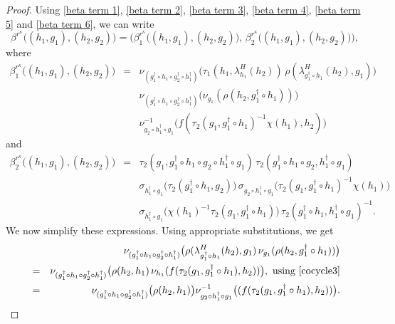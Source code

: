 \documentclass{jonasart}
\theoremstyle{plain}
\begin{document}
\begin{proof}
		Using \eqref{beta term 1}, \eqref{beta term 2}, \eqref{beta term 3}, \eqref{beta term 4}, \eqref{beta term 5} and  \eqref{beta term 6}, we can write
		\begin{equation*}
			\beta^{r^\kappa} \big((h_1,g_1),(h_2,g_2) \big)=\big(\beta^{r^\kappa}_1 \big((h_1,g_1),(h_2,g_2) \big),\, \beta^{r^\kappa}_2 \big((h_1,g_1),(h_2,g_2) \big)\big),
		\end{equation*}
		where
		\begin{eqnarray}
			\beta^{r^\kappa}_1 \big((h_1,g_1),(h_2,g_2) \big)&=&\nu_{(g_1^\dagger\circ h_1\circ g_2^\dagger\circ h_1^\dagger)}\big(\tau_1(h_1,\lambda^H_{ h_1}(h_2))\,\rho(\lambda^H_{g_1^\dagger\circ h_1}(h_2),g_1) \big)\nonumber\\
			&&\nu_{(g_1^\dagger\circ h_1\circ g_2^\dagger\circ h_1^\dagger )} \big(\nu_{g_1}(\rho(h_2,g_1^\dagger\circ h_1)) \big)\nonumber\\
			&&\nu^{-1}_{g_2\circ h_1^{\dagger}\circ g_1} \big(f(\tau_2(g_1,g_1^\dagger\circ h_1)^{-1}\chi(h_1),h_2)\big)\label{beta 1 exp}
		\end{eqnarray}
		and
		\begin{eqnarray*}
			\beta^{r^\kappa}_2 \big((h_1,g_1),(h_2,g_2) \big)&=&\tau_2(g_1,g_1^\dagger\circ h_1\circ g_2\circ h_1^\dagger\circ g_1) \, \tau_2(g_1^\dagger\circ h_1\circ g_2,h_1^\dagger\circ g_1)\nonumber\\
			&&\sigma_{h_1^\dagger\circ g_1} \big(\tau_2(g_1^\dagger\circ h_1,g_2) \big) \, \sigma_{g_2\circ h_1^{\dagger}\circ g_1}\big(\tau_2(g_1,g_1^\dagger\circ h_1)^{-1}\chi(h_1)\big)\nonumber\\
			&&\sigma_{h_1^{\dagger}\circ g_1}\big(\chi(h_1)^{-1}\tau_2(g_1,g_1^\dagger\circ h_1)\big)\, \tau_2(g_1^\dagger\circ h_1,h_1^\dagger\circ g_1)^{-1}.\label{beta 2 exp}
		\end{eqnarray*}
		We now simplify these expressions. Using appropriate substitutions, we get
		\begin{eqnarray*}
			&& \nu_{(g_1^\dagger\circ h_1\circ g_2^\dagger\circ h_1^\dagger)} \big(\rho(\lambda^H_{g_1^\dagger\circ h_1}(h_2),g_1)\, \nu_{g_1}(\rho(h_2,g_1^\dagger\circ h_1)) \big)\\
			&=&\nu_{(g_1^\dagger\circ h_1\circ g_2^\dagger\circ h_1^\dagger)} \big(\rho(h_2,h_1)\, \nu_{h_1}(f(\tau_2(g_1,g_1^\dagger\circ h_1),h_2))\big),~\text{using \eqref{cocycle3}}\\
			&=&\nu_{(g_1^\dagger\circ h_1\circ g_2^\dagger\circ h_1^\dagger)} \big(\rho(h_2,h_1)\big)\nu^{-1}_{g_2\circ h_1^\dagger\circ g_1}\big( (f(\tau_2(g_1,g_1^\dagger\circ h_1),h_2))\big).\\
		\end{eqnarray*}
		

\end{proof}
\end{document}
